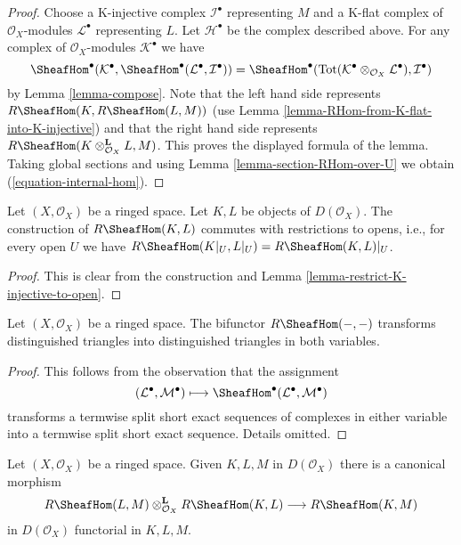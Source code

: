 \begin{proof}
Choose a K-injective complex $\mathcal{I}^\bullet$ representing
$M$ and a K-flat complex of $\mathcal{O}_X$-modules $\mathcal{L}^\bullet$
representing $L$. Let $\mathcal{H}^\bullet$ be the complex described above.
For any complex of $\mathcal{O}_X$-modules $\mathcal{K}^\bullet$
we have
$$
\SheafHom^\bullet(\mathcal{K}^\bullet,
\SheafHom^\bullet(\mathcal{L}^\bullet, \mathcal{I}^\bullet))
=
\SheafHom^\bullet(
\text{Tot}(\mathcal{K}^\bullet \otimes_{\mathcal{O}_X} \mathcal{L}^\bullet),
\mathcal{I}^\bullet)
$$
by Lemma \ref{lemma-compose}.
Note that the left hand side represents
$R\SheafHom(K, R\SheafHom(L, M))$ (use
Lemma \ref{lemma-RHom-from-K-flat-into-K-injective})
and that the right hand side represents
$R\SheafHom(K \otimes_{\mathcal{O}_X}^\mathbf{L} L, M)$.
This proves the displayed formula of the lemma.
Taking global sections and using Lemma \ref{lemma-section-RHom-over-U}
we obtain (\ref{equation-internal-hom}).
\end{proof}

\begin{lemma}
\label{lemma-restriction-RHom-to-U}
Let $(X, \mathcal{O}_X)$ be a ringed space. Let $K, L$ be objects
of $D(\mathcal{O}_X)$. The construction of $R\SheafHom(K, L)$
commutes with restrictions to opens, i.e.,
for every open $U$ we have
$R\SheafHom(K|_U, L|_U) = R\SheafHom(K, L)|_U$.
\end{lemma}

\begin{proof}
This is clear from the construction and
Lemma \ref{lemma-restrict-K-injective-to-open}.
\end{proof}

\begin{lemma}
\label{lemma-RHom-triangulated}
Let $(X, \mathcal{O}_X)$ be a ringed space. The bifunctor $R\SheafHom(- , -)$
transforms distinguished triangles into distinguished triangles in both
variables.
\end{lemma}

\begin{proof}
This follows from the observation that the assignment
$$
(\mathcal{L}^\bullet, \mathcal{M}^\bullet) \longmapsto
\SheafHom^\bullet(\mathcal{L}^\bullet, \mathcal{M}^\bullet)
$$
transforms a termwise split short exact sequences of complexes in either
variable into a termwise split short exact sequence. Details omitted.
\end{proof}

\begin{lemma}
\label{lemma-internal-hom-composition}
Let $(X, \mathcal{O}_X)$ be a ringed space. Given $K, L, M$ in
$D(\mathcal{O}_X)$ there is a canonical morphism
$$
R\SheafHom(L, M) \otimes_{\mathcal{O}_X}^\mathbf{L} R\SheafHom(K, L)
\longrightarrow R\SheafHom(K, M)
$$
in $D(\mathcal{O}_X)$ functorial in $K, L, M$.
\end{lemma}


